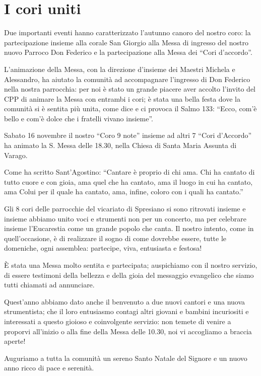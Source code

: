 \section{I cori uniti}

Due importanti eventi hanno caratterizzato l'autunno canoro del nostro coro: la partecipazione insieme alla corale San Giorgio alla Messa di ingresso del nostro nuovo Parroco Don Federico e la partecipazione alla Messa dei ``Cori d'accordo''.

L'animazione della Messa, con la direzione d'insieme dei Maestri Michela e Alessandro, ha aiutato la comunità ad accompagnare l'ingresso di Don Federico nella nostra parrocchia: per noi è stato un grande piacere aver accolto l'invito del CPP di animare la Messa con entrambi i cori; è stata una bella festa dove la comunità si è sentita più unita, come dice e ci provoca il Salmo 133: ``Ecco, com'è bello e com'è dolce che i fratelli vivano insieme''.

Sabato 16 novembre il nostro ``Coro 9 note'' insieme ad altri 7 ``Cori d'Accordo'' ha animato la S. Messa delle 18.30, nella Chiesa di Santa Maria Assunta di Varago.


Come ha scritto Sant'Agostino:
``Cantare è proprio di chi ama. Chi ha cantato di tutto cuore e con gioia, ama quel che ha cantato, ama il luogo in cui ha cantato, ama Colui per il quale ha cantato, ama, infine, coloro con i quali ha cantato.''

Gli 8 cori delle parrocchie del vicariato di Spresiano si sono ritrovati insieme e insieme abbiamo unito voci e strumenti non per un concerto, ma per celebrare insieme l'Eucarestia come un grande popolo che canta.
Il nostro intento, come in quell'occasione, è di realizzare il sogno di come dovrebbe essere, tutte le domeniche, ogni assemblea: partecipe, viva, entusiasta e festosa!

È stata una Messa molto sentita e partecipata; auspichiamo con il nostro servizio, di essere testimoni della bellezza e della gioia del messaggio evangelico che siamo tutti chiamati ad annunciare.

Quest'anno abbiamo dato anche il benvenuto a due nuovi cantori e una nuova strumentista; che il loro entusiasmo contagi altri giovani e bambini incuriositi e interessati a questo gioioso e coinvolgente servizio: non temete di venire a proporvi all'inizio o alla fine della Messa delle 10.30, noi vi accogliamo a braccia aperte!

Auguriamo a tutta la comunità un sereno Santo Natale del Signore e un nuovo anno ricco di pace e serenità.



